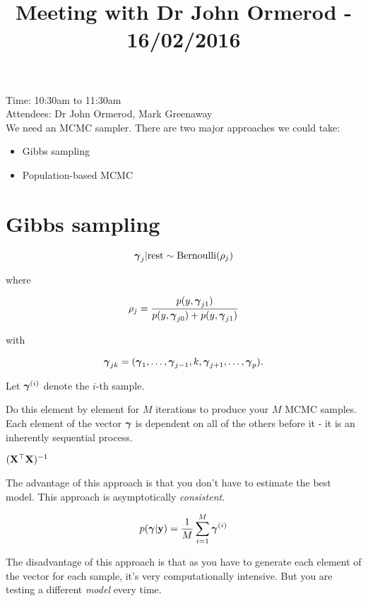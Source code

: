 \documentclass{amsart}
\title{Meeting with Dr John Ormerod - 16/02/2016}
\begin{document}
\maketitle

Time: 10:30am to 11:30am \\
Attendees: Dr John Ormerod, Mark Greenaway \\

We need an MCMC sampler. There are two major approaches we could take:

\begin{itemize}
	\item Gibbs sampling
	\item Population-based MCMC
\end{itemize}

\section{Gibbs sampling}

\def \Bernoulli {\text{Bernoulli}}
\[
	\vgamma_j | \text{rest} \sim \Bernoulli(\rho_j)
\]

where

\[
	\rho_j = \frac{p(y, {\boldsymbol \gamma}_{j1})}{p(y, {\boldsymbol \gamma}_{j0}) + p(y, {\boldsymbol \gamma}_{j1})}
\]

with

\[
	{\boldsymbol \gamma}_{jk} = ({\boldsymbol \gamma}_1, \ldots, {\boldsymbol \gamma}_{j-1}, k, {\boldsymbol \gamma}_{j+1}, \ldots, {\boldsymbol \gamma}_p).
\]

Let ${\boldsymbol \gamma}^{(i)}$ denote the $i$-th sample.


Do this element by element for $M$ iterations to produce your $M$ MCMC samples. Each element of the vector
${\boldsymbol \gamma}$ is dependent on all of the others before it - it is an inherently sequential process.

$({\bf X}^\top {\bf X})^{-1}$

The advantage of this approach is that you don't have to estimate the best model. This approach is 
asymptotically \emph{consistent}.

\[
	p({\boldsymbol \gamma} | {\bf y}) = \frac{1}{M} \sum_{i=1}^M {\boldsymbol \gamma}^{(i)}
\]

The disadvantage of this approach is that as you have to generate each element of the vector for each
sample, it's very computationally intensive. But you are testing a different \emph{model} every time.
\end{document}
